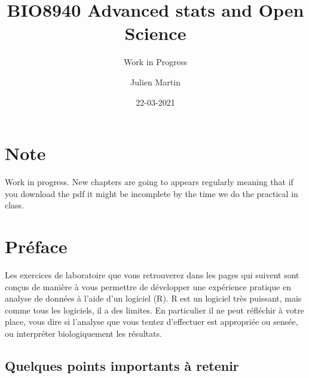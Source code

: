 \documentclass[
  12pt,
]{book}
\title{BIO8940 Advanced stats and Open Science}
\subtitle{Work in Progress}
\author{Julien Martin}
\date{22-03-2021}
\makeatletter
\newenvironment{kframe}{%
\medskip{}
\setlength{\fboxsep}{.8em}
\def\at@end@of@kframe{}%
\ifinner\ifhmode%
 \def\at@end@of@kframe{\end{minipage}}%
 \begin{minipage}{\columnwidth}%
\fi\fi%
\def\FrameCommand##1{\hskip\@totalleftmargin \hskip-\fboxsep
\colorbox{incolor}{##1}\hskip-\fboxsep
    \hskip-\linewidth \hskip-\@totalleftmargin \hskip\columnwidth}%
\MakeFramed {\advance\hsize-\width
  \@totalleftmargin\z@ \linewidth\hsize
  \@setminipage}}%
{\par\unskip\endMakeFramed%
\at@end@of@kframe}
\newenvironment{rmdblock}[1]
 {
 \begin{itemize}
 \renewcommand{\labelitemi}{
   \raisebox{-.7\height}[0pt][0pt]{
     {\setkeys{Gin}{width=3em,keepaspectratio}\texttt{[image: images/icons/\#1]}}
   }
 }
 \begin{kframe}
 \setlength{\fboxsep}{1em}
 \item
 }
 {
 \end{kframe}
 \end{itemize}
 }
\newenvironment{rmdimportant}
  {\begin{rmdblock}{important}}
  {\end{rmdblock}}
\makeatother
\begin{document}
\maketitle



{
\setcounter{tocdepth}{1}
\tableofcontents
}
\hypertarget{note}{%
\chapter*{Note}\label{note}}

\begin{rmdimportant}
Work in progress. New chapters are going to appears regularly meaning that if you download the pdf it might be incomplete by the time we do the practical in class.
\end{rmdimportant}

\hypertarget{pruxe9face}{%
\chapter*{Préface}\label{pruxe9face}}

Les exercices de laboratoire que vous retrouverez dans les pages qui suivent sont conçus de manière à vous permettre de développer une expérience pratique en analyse de données à l'aide d'un logiciel (R).
R est un logiciel très puissant, mais comme tous les logiciels, il a des limites.
En particulier il ne peut réfléchir à votre place, vous dire si l'analyse que vous tentez d'effectuer est appropriée ou sensée, ou interpréter biologiquement les résultats.

\hypertarget{quelques-points-importants-uxe0-retenir}{%
\section*{Quelques points importants à retenir}\label{quelques-points-importants-uxe0-retenir}}
\end{document}

